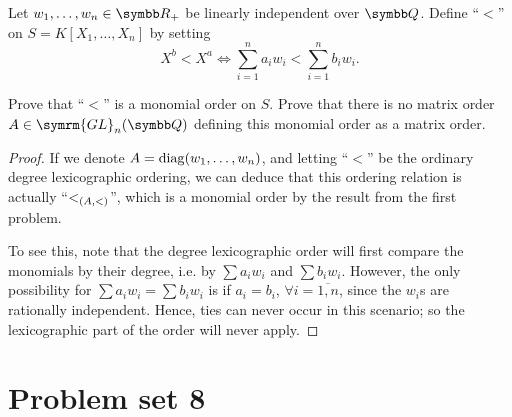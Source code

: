 \begin{problem}
Let \(w_1, \dots, w_n \in \reals_+\) be linearly independent over \(\rationals\). Define ``\(<\)'' on \(S = K[X_1, \dots, X_n]\) by setting
\[
    X^b < X^a \iff \sum_{i = 1}^{n} a_i w_i < \sum_{i = 1}^{n} b_i w_i.
\]

Prove that ``\(<\)'' is a monomial order on \(S\). Prove that there is no matrix order \(A \in \symrm{GL}_n(\rationals)\) defining this monomial order as a matrix order.
\end{problem}
\begin{proof}
If we denote \(A = \operatorname{diag}(w_1, \dots, w_n)\), and letting ``\(<\)'' be the ordinary degree lexicographic ordering, we can deduce that this ordering relation is actually ``\(<_{(A, <)}\)'', which is a monomial order by the result from the first problem.

To see this, note that the degree lexicographic order will first compare the monomials by their degree, i.e. by \(\sum a_i w_i\) and \(\sum b_i w_i\). However, the only possibility for \(\sum a_i w_i = \sum b_i w_i\) is if \(a_i = b_i\), \(\forall i = \overline{1, n}\), since the \(w_i\)s are rationally independent. Hence, ties can never occur in this scenario; so the lexicographic part of the order will never apply.
\end{proof}

\section*{Problem set 8}

